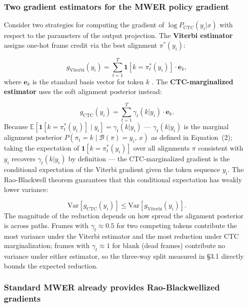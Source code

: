 \subsubsection{Two gradient estimators for the MWER policy gradient}

Consider two strategies for computing the gradient of $\log P_\text{CTC}(y_i|x)$ with respect to the parameters of the output projection. The \textbf{Viterbi estimator} assigns one-hot frame credit via the best alignment $\pi^*(y_i)$:

\begin{equation*}
g_\text{Viterbi}(y_i) = \sum_{t=1}^{T} \mathbf{1}[k = \pi^*_t(y_i)] \cdot \mathbf{e}_k, \tag{5}
\end{equation*}
where $\mathbf{e}_k$ is the standard basis vector for token $k$ \cite{shannon2017}. The \textbf{CTC-marginalized estimator} uses the soft alignment posterior instead:

\begin{equation*}
g_\text{CTC}(y_i) = \sum_{t=1}^{T} \gamma_t(k|y_i) \cdot \mathbf{e}_k. \tag{6}
\end{equation*}
Because $\mathbb{E}[\mathbf{1}[k = \pi^*_t(y_i)] \mid y_i] = \gamma_t(k|y_i)$ — $\gamma_t(k|y_i)$ is the marginal alignment posterior $P(\pi_t = k \mid \mathcal{B}(\pi) = y_i,\, x)$ as defined in Equation~(2); taking the expectation of $\mathbf{1}[k = \pi^*_t(y_i)]$ over all alignments $\pi$ consistent with $y_i$ recovers $\gamma_t(k|y_i)$ by definition — the CTC-marginalized gradient is the conditional expectation of the Viterbi gradient given the token sequence $y_i$. The Rao-Blackwell theorem \cite{casella1996rao, ranganath2014bbvi} guarantees that this conditional expectation has weakly lower variance:

\begin{equation*}
\text{Var}[g_\text{CTC}(y_i)] \leq \text{Var}[g_\text{Viterbi}(y_i)]. \tag{7}
\end{equation*}
The magnitude of the reduction depends on how spread the alignment posterior is across paths. Frames with $\gamma_t \approx 0.5$ for two competing tokens contribute the most variance under the Viterbi estimator and the most reduction under CTC marginalization; frames with $\gamma_t \approx 1$ for blank (dead frames) contribute no variance under either estimator, so the three-way split measured in §3.1 directly bounds the expected reduction.

\subsubsection{Standard MWER already provides Rao-Blackwellized gradients}

